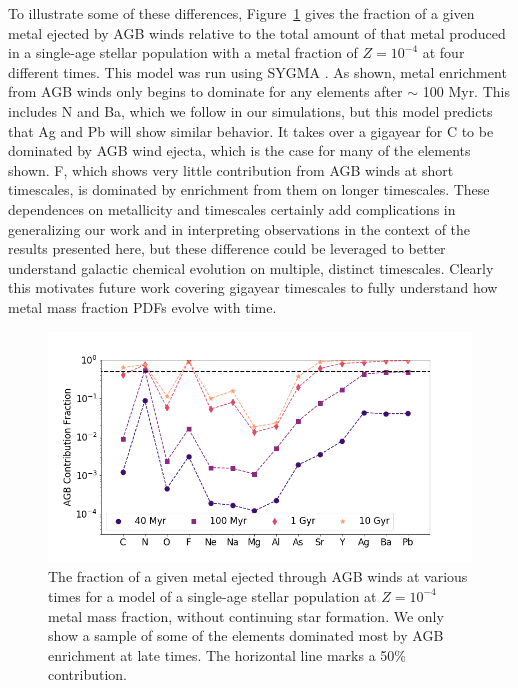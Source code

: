 To illustrate some of these differences, Figure~\ref{fig:agb evolution} gives the fraction of a given metal ejected by AGB winds relative to the total amount of that metal produced in a single-age stellar population with a metal fraction of $Z = 10^{-4}$ at four different times. This model was run using \textsc{SYGMA} \citep{Ritter2018b}. As shown, metal enrichment from AGB winds only begins to dominate for any elements after $\sim$ 100 Myr. This includes N and Ba, which we follow in our simulations, but this model predicts that Ag and Pb will show similar behavior. It takes over a gigayear for C to be dominated by AGB wind ejecta, which is the case for many of the elements shown. F, which shows very little contribution from AGB winds at short timescales, is dominated by enrichment from them on longer timescales. These dependences on metallicity and timescales certainly add complications in generalizing our work and in interpreting observations in the context of the results presented here, but these difference could be leveraged to better understand galactic chemical evolution on multiple, distinct timescales. Clearly this motivates future work covering gigayear timescales to fully understand how metal mass fraction PDFs evolve with time.

\begin{figure}
\centering
\includegraphics[width=0.95\linewidth]{figures/ch3/Half_AGB_Fraction_elements_s0}
\caption{The fraction of a given metal ejected through AGB winds at various times for a model of a single-age stellar population at $Z = 10^{-4}$ metal mass fraction, without continuing star formation. We only show a sample of some of the elements dominated most by AGB enrichment at late times. The horizontal line marks a 50\% contribution.}
\label{fig:agb evolution}
\end{figure}

